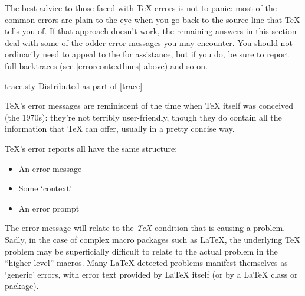 The best advice to those faced with \TeX{} errors is not to panic:
most of the common errors are plain to the eye when you go back to the
source line that \TeX{} tells you of.  If that approach doesn't work,
the remaining answers in this section deal with some of the odder
error messages you may encounter.  You should not ordinarily need to
appeal to the 
for assistance, but if you do, be sure to
report full backtraces (see |errorcontextlines| above) and so on.
\begin{ctanrefs}
\item[trace.sty]Distributed as part of [trace]
\end{ctanrefs}


\TeX{}'s error messages are reminiscent of the time when \TeX{} itself
was conceived (the 1970s): they're not terribly user-friendly, though
they do contain all the information that \TeX{} can offer, usually in
a pretty concise way.

\TeX{}'s error reports all have the same structure:
\begin{itemize}
\item An error message
\item Some `context'
\item An error prompt
\end{itemize}
The error message will relate to the \emph{\TeX{}} condition that is
causing a problem.  Sadly, in the case of complex macro packages such
as \LaTeX{}, the underlying \TeX{} problem may be superficially
difficult to relate to the actual problem in the ``higher-level''
macros.  Many \LaTeX{}-detected problems manifest themselves as
`generic' errors, with error text provided by \LaTeX{} itself (or by a
\LaTeX{} class or package).

